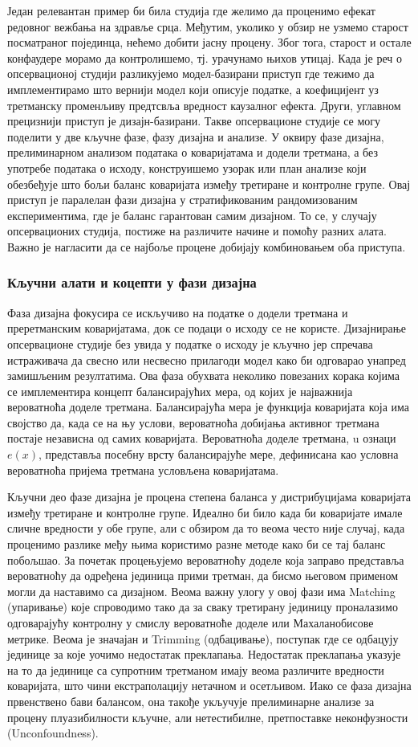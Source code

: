 \documentclass[12pt, a4paper]{article}
\begin{document}
Један релевантан пример би била студија где желимо да проценимо ефекат редовног вежбања на здравље срца. Међутим, уколико у обзир не узмемо старост посматраног појединца, нећемо добити јасну процену. Због тога, старост и остале конфаудере морамо да контролишемо, тј. урачунамо њихов утицај. 
Када је реч о опсервационој студији разликујемо модел-базирани приступ где тежимо да имплементирамо што вернији модел који описује податке, а коефицијент уз третманску променљиву предтсвља вредност каузалног ефекта. Други, углавном прецизнији приступ је дизајн-базирани. Такве опсервационе студије се могу поделити у две кључне фазе, фазу дизајна и анализе. У оквиру фазе дизајна, прелиминарном анализом података о коваријатама и додели третмана, а без употребе података о исходу, конструишемо узорак или план анализе који обезбеђује што бољи баланс коваријата између третиране и контролне групе. Овај приступ је паралелан фази дизајна у стратификованим рандомизованим експериментима, где је баланс гарантован самим дизајном. То се, у случају опсервационих студија, постиже на различите начине и помоћу разних алата. 
Важно је нагласити да се најбоље процене добијају комбиновањем оба приступа.
\subsubsection{Кључни алати и коцепти у фази дизајна}
Фаза дизајна фокусира се искључиво на податке о додели третмана и преретманским коваријатама, док се подаци о исходу се не користе. Дизајнирање опсервационе студије без увида у податке о исходу је кључно јер спречава истраживача да свесно или несвесно прилагоди модел како би одговарао унапред замишљеним резултатима. Ова фаза обухвата неколико повезаних корака којима се имплементира концепт балансирајућих мера, од којих је најважнија вероватноћа доделе третмана. Балансирајућа мера је функција коваријата која има својство да, када се на њу услови, вероватноћа добијања активног третмана постаје независна од самих коваријата. Вероватноћа доделе третмана, u ознаци $e(x)$, представља посебну врсту балансирајуће мере, дефинисана као условна вероватноћа пријема третмана условљена коваријатама.  

Кључни део фазе дизајна је процена степена баланса у дистрибуцијама коваријата између третиране и контролне групе. Идеално би било када би коваријате имале сличне вредности у обе групе, али с обзиром да то веома често није случај, када проценимо разлике међу њима користимо разне методе како би се тај баланс побољшао. За почетак  процењујемо вероватноћу доделе која заправо представља вероватноћу да одређена јединица прими третман, да бисмо његовом применом могли да наставимо са дизајном. Веома важну улогу у овој фази има  Matching (упаривање) које спроводимо тако да за сваку третирану јединицу проналазимо одговарајућу контролну у смислу вероватноће доделе или Махаланобисове метрике. Веома је значајан и  Trimming (одбацивање), поступак где се одбацују јединице за које уочимо недостатак преклапања. Недостатак преклапања указује на то да јединице са супротним третманом имају веома различите вредности коваријата, што чини екстраполацију нетачном и осетљивом. Иако се фаза дизајна првенствено бави балансом, она такође укључује прелиминарне анализе за процену плуазибилности кључне, али нетестибилне, претпоставке неконфузности (Unconfoundness).
\end{document}

